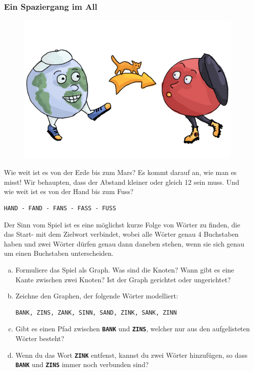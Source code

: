 \subsubsection*{Ein Spaziergang im All}
\begin{figure}[H]
    \centering
    \includegraphics[width=\textwidth]{Pictures/SP/erde_mars.png}
\end{figure}
Wie weit ist es von der Erde bis zum Mars? Es kommt darauf an, wie man es misst! Wir behaupten, dass der Abstand kleiner oder gleich 12 sein muss. Und wie weit ist es von der Hand bis zum Fuss?
\begin{lstlisting}
HAND - FAND - FANS - FASS - FUSS
\end{lstlisting}
Der Sinn vom Spiel ist es eine möglichst kurze Folge von Wörter zu finden, die das Start- mit dem Zielwort verbindet, wobei alle Wörter genau 4 Buchstaben haben und zwei Wörter dürfen genau dann daneben stehen, wenn sie sich genau um einen Buchstaben unterscheiden.


\begin{aufgabe}
\begin{enumerate}[(a)]\label{aufgabe_erde_mars_graph}
    \item Formuliere das Spiel als Graph. Was sind die Knoten? Wann gibt es eine Kante zwischen zwei Knoten? Ist der Graph gerichtet oder ungerichtet?
    \item Zeichne den Graphen, der folgende Wörter modelliert:
\begin{lstlisting}
BANK, ZINS, ZANK, SINN, SAND, ZINK, SANK, ZINN
\end{lstlisting}
    \item Gibt es einen Pfad zwischen \textbf{\texttt{BANK}} und \textbf{\texttt{ZINS}}, welcher nur aus den aufgelisteten Wörter besteht?
    \item Wenn du das Wort \textbf{\texttt{ZINK}} entfenst, kannst du zwei Wörter hinzufügen, so dass \textbf{\texttt{BANK}} und \textbf{\texttt{ZINS}} immer noch verbunden sind?
\end{enumerate}

\end{aufgabe}

